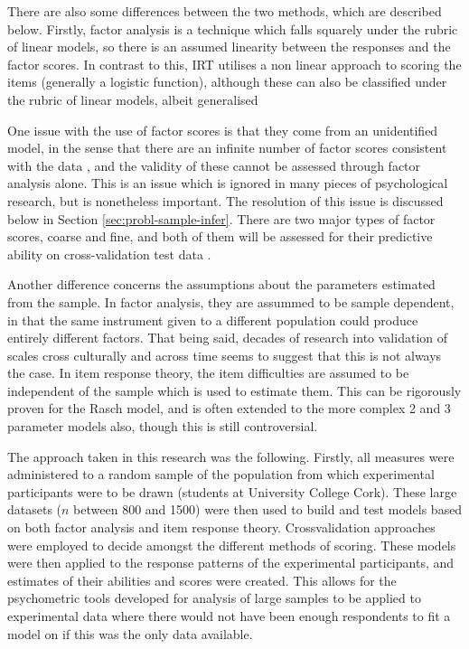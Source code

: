 There are also some differences between the two methods, which are described below. Firstly, factor analysis is a technique which falls squarely under the rubric of linear models\cite{venables2002modern}, so there is an assumed linearity between the responses and the factor scores. In contrast to this, IRT utilises a non linear approach to scoring the items (generally a logistic function), although these can also be classified under the rubric of linear models, albeit generalised \cite{venables2002modern} 

One issue with the use of factor scores is that they come from an unidentified model, in the sense that there are an infinite number of factor scores consistent with the data \cite{grice2001computingit}, and the validity of these cannot be assessed through factor analysis alone. This is an issue which is ignored in many pieces of psychological research, but is nonetheless important. The resolution of this issue is discussed below in Section \ref{sec:probl-sample-infer}. There are two major types of factor scores, coarse and fine, and both of them will be assessed for their predictive ability on cross-validation test data \cite{grice2001computingit}.  

Another difference concerns the assumptions about the parameters estimated from the sample. In factor analysis, they are assummed to be sample dependent, in that the same instrument given to a different population could produce entirely different factors. That being said, decades of research into validation of scales cross culturally and across time seems to suggest that this is not always the case. In item response theory, the item difficulties are assumed to be independent of the sample which is used to estimate them. This can be rigorously proven for the Rasch model, and is often extended to the more complex 2 and 3 parameter models also, though this is still controversial\cite{van1997handbook}. 

The approach taken in this research  was the following. Firstly, all measures were administered to a random sample of the population from which experimental participants were to be drawn (students at University College Cork). These large datasets ($n$ between 800 and 1500) were then used to build and test models based on both factor analysis and item response theory. 
Crossvalidation \cite{friedman2009elements} approaches were employed to decide amongst the different methods of scoring. These models were then  applied to the response patterns of the experimental participants, and estimates of their abilities and scores were created. This allows for the psychometric tools developed for analysis of large samples to be applied to experimental data where there would not have been enough respondents to fit a model on if this was the only data available.   

